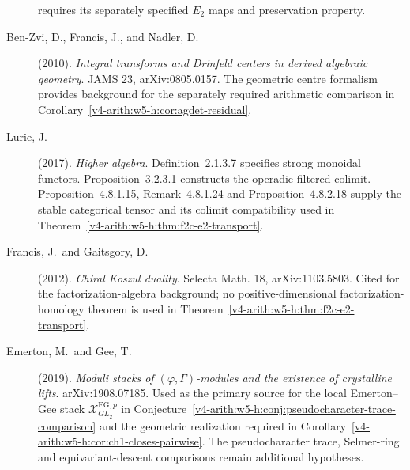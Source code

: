 \begin{description}
requires its separately specified $E_2$ maps and preservation property.
\item[Ben-Zvi, D., Francis, J., and Nadler, D.] (2010). \emph{Integral
transforms and Drinfeld centers in derived algebraic geometry}.
JAMS 23, arXiv:0805.0157. The geometric centre formalism provides background for the
separately required arithmetic comparison in
Corollary~\ref{v4-arith:w5-h:cor:agdet-residual}.
\item[Lurie, J.] (2017). \emph{Higher algebra}.
Definition~2.1.3.7 specifies strong monoidal functors.
Proposition~3.2.3.1 constructs the operadic filtered colimit.
Proposition~4.8.1.15, Remark~4.8.1.24 and
Proposition~4.8.2.18 supply the stable categorical tensor and
its colimit compatibility used in
Theorem~\ref{v4-arith:w5-h:thm:f2c-e2-transport}.
\item[Francis, J.\ and Gaitsgory, D.] (2012). \emph{Chiral
Koszul duality}. Selecta Math. 18, arXiv:1103.5803. Cited for the
factorization-algebra background; no positive-dimensional
factorization-homology theorem is used in
Theorem~\ref{v4-arith:w5-h:thm:f2c-e2-transport}.
\item[Emerton, M.\ and Gee, T.] (2019). \emph{Moduli stacks of
\((\varphi,\Gamma)\)-modules and the existence of crystalline lifts}.
arXiv:1908.07185. Used as the
primary source for the local Emerton--Gee stack
\(\mathcal{X}^{\mathrm{EG},p}_{GL_{2}}\) in
Conjecture~\ref{v4-arith:w5-h:conj:pseudocharacter-trace-comparison}
and the geometric realization required in
Corollary~\ref{v4-arith:w5-h:cor:ch1-closes-pairwise}. The pseudocharacter
trace, Selmer-ring and equivariant-descent comparisons remain
additional hypotheses.
\end{description}

